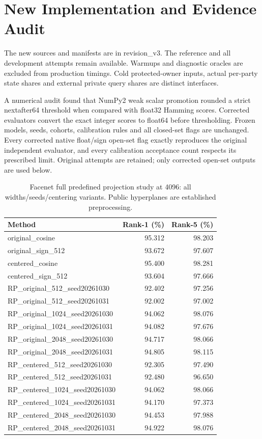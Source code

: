 \section{New Implementation and Evidence Audit}

The new sources and manifests are in revision\_v3. The reference and all development attempts remain available. Warmups and diagnostic oracles are excluded from production timings. Cold protected-owner inputs, actual per-party state shares and external private query shares are distinct interfaces.

A numerical audit found that NumPy2 weak scalar promotion rounded a strict nextafter64 threshold when compared with float32 Hamming scores. Corrected evaluators convert the exact integer scores to float64 before thresholding. Frozen models, seeds, cohorts, calibration rules and all closed-set flags are unchanged. Every corrected native float/sign open-set flag exactly reproduces the original independent evaluator, and every calibration acceptance count respects its prescribed limit. Original attempts are retained; only corrected open-set outputs are used below.

\begin{table}[t]
\caption{Facenet full predefined projection study at 4096: all widths/seeds/centering variants. Public hyperplanes are established preprocessing.}
\label{tab:v3allfacenet}\centering\small
\setlength{\tabcolsep}{3pt}
\begin{tabular}{lrr}
\toprule
Method & Rank-1 (\%) & Rank-5 (\%) \\
\midrule
original\_cosine & 95.312 & 98.203 \\
original\_sign\_512 & 93.672 & 97.607 \\
centered\_cosine & 95.400 & 98.281 \\
centered\_sign\_512 & 93.604 & 97.666 \\
RP\_original\_512\_seed20261030 & 92.402 & 97.256 \\
RP\_original\_512\_seed20261031 & 92.002 & 97.002 \\
RP\_original\_1024\_seed20261030 & 94.062 & 98.076 \\
RP\_original\_1024\_seed20261031 & 94.082 & 97.676 \\
RP\_original\_2048\_seed20261030 & 94.717 & 98.066 \\
RP\_original\_2048\_seed20261031 & 94.805 & 98.115 \\
RP\_centered\_512\_seed20261030 & 92.305 & 97.490 \\
RP\_centered\_512\_seed20261031 & 92.480 & 96.650 \\
RP\_centered\_1024\_seed20261030 & 94.062 & 98.066 \\
RP\_centered\_1024\_seed20261031 & 94.170 & 97.373 \\
RP\_centered\_2048\_seed20261030 & 94.453 & 97.988 \\
RP\_centered\_2048\_seed20261031 & 94.922 & 98.076 \\
\bottomrule
\end{tabular}
\end{table}


